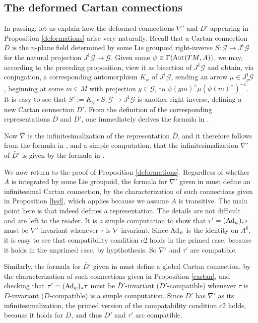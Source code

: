 \documentclass[leqno,12pt]{amsart} %
\newcommand{\varcheck}[1]{{#1^\wedge}} \newcommand{\model}{\automorphism({TM},A)}
\begin{document}
\subsection{The deformed Cartan connections}
In passing, let us explain how the deformed connections $\nabla'$ and $D'$ appearing in
Proposition \ref{deformations} arise very naturally. Recall that a Cartan connection $D$
is the $n$-plane field determined by some Lie groupoid right-inverse
$S \colon {\mathcal G} \rightarrow J^1 {\mathcal G}$ for the natural projection
$ J^1 {\mathcal G} \rightarrow {\mathcal G}$. Given some $\psi \in \Gamma(\model)$, we
may, according to the preceding proposition, view it as bisection of $J^1 {\mathcal G} $
and obtain, via conjugation, a corresponding automorphism $K_\psi$ of $J^1 {\mathcal G}$,
sending an arrow $\mu \in J^1_g {\mathcal G} $, beginning at some $m \in M$ with
projection $g \in {\mathcal G}$, to $\varcheck{\psi(gm)}\mu (\varcheck{\psi(m)})^{-1}$. It
is easy to see that $S':=K_\psi \circ S \colon {\mathcal G} \rightarrow J^1 {\mathcal G} $
is another right-inverse, defining a new Cartan connection $D'$. From the definition of
the corresponding representations $\bar D$ and $\bar D'$, one immediately derives the
formula in .

Now $\bar\nabla $ is the infinitesimalization of the representation $\bar D $, and it
therefore follows from the formula in , and a simple
computation, that the infinitesimalization $\bar\nabla'$ of $\bar D'$ is given by the
formula in .

We now return to the proof of Proposition \ref{deformations}. Regardless of whether $A$ is
integrated by some Lie groupoid, the formula for $\bar\nabla'$ given in
 must define an infinitesimal Cartan connection, by the
characterization of such connections given in Proposition \ref{hsd}, which applies because
we assume $A$ is transitive. The main point here is that 
indeed defines a representation. The details are not difficult and are left to the
reader. It is a simple computation to show that $\tau' = (\operatorname{Ad}_\psi)_*\tau $ must be
$\bar\nabla'$-invariant whenever $\tau $ is $\bar\nabla$-invariant. Since $\operatorname{Ad}_\psi$
is the identity on $A^0$, it is easy to see that compatibility condition c2 holds in the
primed case, because it holds in the unprimed case, by hypthothesis. So $\nabla'$ and
$\tau'$ are compatible.

Similarly, the formula for $\bar D'$ given in  must define a
global Cartan connection, by the characterization of such connections given in Proposition
\ref{cartan}, and checking that $\tau' = (\operatorname{Ad}_\psi)_*\tau $ must be
$\bar D'$-invariant ($D'$-compatible) whenever $\tau $ is $\bar D$-invariant
($D$-compatible) is a simple computation. Since $D'$ has $\nabla'$ as its
infinitesimalization, the primed version of the compatability condition c2 holds, because
it holds for $D$, and thus $D'$ and $\tau'$ are compatible.
\end{document}
